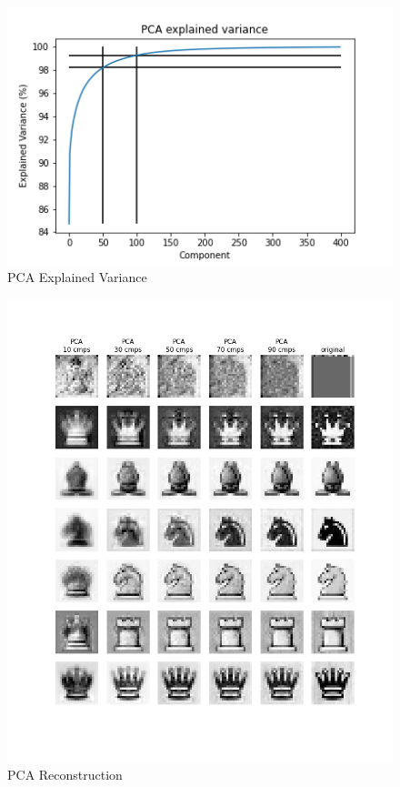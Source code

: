 \documentclass{article}
\begin{document}
\begin{multicols}{2}
\begin{figure}[H]
\includegraphics[width=\linewidth]{PCA_Explained_nonorm.png} 
\caption{PCA Explained Variance}
\label{fig:PCA_nonorm}
\end{figure}

\begin{figure}[H]
\includegraphics[width=\linewidth]{PCA_Reconstruction.png}
\caption{PCA Reconstruction}
\label{fig:PCA_recon}
\end{figure}


\end{multicols}
\end{document}
